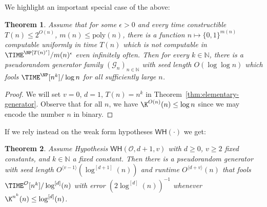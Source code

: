 \documentclass[11pt]{article}
\newtheorem{theorem}{Theorem}
\newcommand{\B}{\{0,1\}}
\newcommand{\od}[1]{O^{\langle #1 \rangle}}
\newcommand{\WH}{\mathsf{WH}}
\newcommand{\todo}[1]{{\color{red} TODO: #1}}
\renewcommand{\poly}{\mathrm{poly}}
\begin{document}
We highlight an important special case of the above:
\begin{theorem}\label{thm:double-exp-generator}
Assume that for some $\epsilon> 0$ and every time constructible $T(n) \leq 2^{O(n)}$, $m(n) \leq \poly(n)$, there is a function $n \mapsto \B^{m(n)}$ computable uniformly in time $T(n)$ which is not computable in $\TIME^\NP[T(n)^\epsilon]/m(n)^{\epsilon}$ even infinitely often. Then for every $k \in \mathbb{N}$, there is a pseudorandom generator family $(\mathcal{G}_n)_{n \in \mathbb{N}}$ with seed length $O(\log \log n)$ which fools $\TIME^{\NP}[n^k]/\log n$ for all sufficiently large $n$.
\end{theorem}
\begin{proof}
We will set $v=0$, $d = 1$, $T(n) = n^k$ in Theorem~\ref{thm:elementary-generator}. Observe that for all $n$, we have $\K^{O(n)}(n) \leq \log n$ since we may encode the number $n$ in binary.
\end{proof}

If we rely instead on the weak form hypotheses $\WH(\cdot)$ we get:

\begin{theorem}\label{thm:weak-generator}
Assume Hypothesis $\WH(\mathcal{O},d+1,v)$ with $d \geq 0$, $v \geq 2$ fixed constants, and $k \in \mathbb{N}$ a fixed constant. Then there is a pseudorandom generator with seed length $\od{v -1 }(\log^{[d+1]}(n))$ and runtime $\od{d+v}(n)$ that fools $\TIME^\mathcal{O}[n^k]/\log^{[d]}(n)$ with error $(2 \log^{[d]}(n))^{-1}$ whenever $\K^{n^k}(n) \leq \log^{[d]}(n)$. 
\end{theorem}
\end{document}
